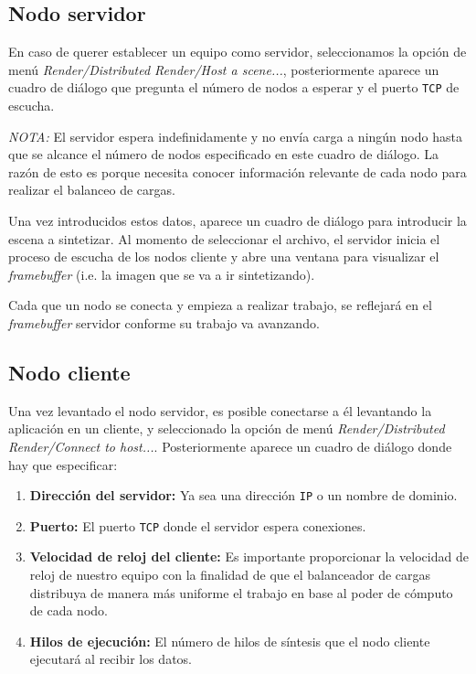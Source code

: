 \documentclass[]{article}
\begin{document}
\subsection{Nodo servidor}

En caso de querer establecer un equipo como servidor, seleccionamos la opción de menú \emph{Render/Distributed Render/Host a scene...}, posteriormente aparece un cuadro de diálogo que pregunta el número de nodos a esperar y el puerto \texttt{TCP} de escucha.

\emph{NOTA: } El servidor espera indefinidamente y no envía carga a ningún nodo hasta que se alcance el número de nodos especificado
en este cuadro de diálogo.  La razón de esto es porque necesita conocer información relevante de cada nodo para realizar el balanceo
de cargas.

Una vez introducidos estos datos, aparece un cuadro de diálogo para introducir la escena a sintetizar.  Al momento de seleccionar el
archivo, el servidor inicia el proceso de escucha de los nodos cliente y abre una ventana para visualizar el \emph{framebuffer} (i.e. la imagen que se va a ir sintetizando).

Cada que un nodo se conecta y empieza a realizar trabajo, se reflejará en el \emph{framebuffer} servidor conforme su trabajo va 
avanzando.

\subsection{Nodo cliente}

Una vez levantado el nodo servidor, es posible conectarse a él levantando la aplicación en un cliente, y seleccionado la opción de
menú \emph{Render/Distributed Render/Connect to host...}.  Posteriormente aparece un cuadro de diálogo donde hay que especificar:
\begin{enumerate}
 \item \textbf{Dirección del servidor: } Ya sea una dirección \texttt{IP} o un nombre de dominio.
 \item \textbf{Puerto: } El puerto \texttt{TCP} donde el servidor espera conexiones.
 \item \textbf{Velocidad de reloj del cliente: } Es importante proporcionar la velocidad de reloj de nuestro equipo con la finalidad
 de que el balanceador de cargas distribuya de manera más uniforme el trabajo en base al poder de cómputo de cada nodo.
 \item \textbf{Hilos de ejecución: } El número de hilos de síntesis que el nodo cliente ejecutará al recibir los datos.  
\end{enumerate}
\end{document}
